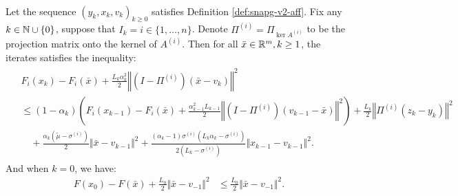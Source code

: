 \documentclass[12pt]{article}
\begin{document}
    \begin{lemma}\;\label{lemma:snagp2-one-step-s1}\\
        Let the sequence $(y_k, x_k, v_k)_{k \ge 0}$ satisfies Definition \ref{def:snapg-v2-aff}. 
        Fix any $k \in \mathbb N \cup\{0\}$, suppose that $I_k = i \in \{1, \ldots, n\}$.
        Denote $\Pi^{(i)} = \Pi_{\ker A^{(i)}}$ to be the projection matrix onto the kernel of $A^{(i)}$. 
        Then for all $\bar x \in \mathbb R^m, k \ge 1$, the iterates satisfies the inequality: 
        \begin{align}\label{ineq:snagp2-one-step-s1-rslt1}
            \begin{split}
                &F_i(x_{k}) - F_i(\bar x) 
                + \frac{L_k\alpha_k^2}{2} \left\Vert \left(I - \Pi^{(i)}\right)(\bar x - v_k)\right\Vert^2
                \\
                &\le 
                (1 - \alpha_k)\left(
                    F_i(x_{k - 1}) - F_i(\bar x) + \frac{\alpha_{k - 1}^2L_{k - 1}}{2}
                    \left\Vert \left(I - \Pi^{(i)}\right)(v_{k - 1} - \bar x)\right\Vert^2
                \right)     
                + \frac{L_k}{2}\left\Vert \Pi^{(i)}(z_k - y_k)\right\Vert^2
                    \\ &\quad 
                    + \frac{\alpha_k(\tilde\mu - \sigma^{(i)})}{2}\Vert \bar x - v_{k - 1}\Vert^2
                    + \frac{(\alpha_k - 1)\sigma^{(i)}\left(L_k\alpha_k - \sigma^{(i)}\right)}{2\left(L_k - \sigma^{(i)}\right)}\Vert x_{k - 1} - v_{k - 1} \Vert^2.
            \end{split}
        \end{align}
        And when $k = 0$, we have: 
        \begin{align}\label{ineq:snagp2-one-step-s1-rslt2}
            F(x_0) - F(\bar x) + \frac{L_0}{2}\Vert \bar x - v_{-1}\Vert^2 
            &\le \frac{L_0}{2}\Vert \bar x - v_{-1}\Vert^2. 
        \end{align}
    \end{lemma}
\end{document}
